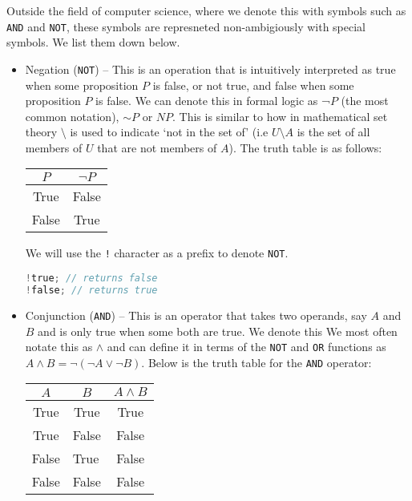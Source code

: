 Outside the field of computer science, where we denote this with symbols such as \verb+AND+ and \verb+NOT+, these symbols are represneted non-ambigiously with special symbols. We list them down below. 

\begin{itemize}

\item Negation (\verb+NOT+) – This is an operation that is intuitively interpreted as true when some proposition \(P\) is false, or not true, and false when some proposition \(P\) is false. We can denote this in formal logic as ¬\(P\) (the most common notation), \(\sim P\) or \(NP\). This is similar to how in mathematical set theory \(\setminus \) is used to indicate `not in the set of' (i.e \({\displaystyle U\setminus A}\) is the set of all members of \(U\) that are not members of \(A\)). The truth table is as follows:


\begin{table}[h]
{\centering
\begin{tabular}{|c|c|}
\hline
\rowcolor[HTML]{EFEFEF} 
\(P\) & \(\neg P\) \\ \hline
True       & False           \\ \hline
False      & True            \\ \hline
\end{tabular} \par }
\end{table}

We will use the \verb+!+ character as a prefix to denote \verb+NOT+. 

\begin{lstlisting}[language=C]
!true; // returns false
!false; // returns true
\end{lstlisting}

\item Conjunction (\verb+AND+) – This is an operator that takes two operands, say \(A\) and \(B\) and is only true when some both are true. We denote this We most often notate this as \(\wedge\) and can define it in terms of the \verb+NOT+ and \verb+OR+ functions as  \(A \wedge B = \neg(\neg A \lor \neg B) \). Below is the truth table for the \verb+AND+ operator:

\begin{table}[h]
{\centering
\begin{tabular}{|c|c|c|}
\hline
\rowcolor[HTML]{EFEFEF} 
\(A\)                           & \(B\)                 & \(A \wedge B\) \\ \hline
True                        & True                       & True       \\ \hline
True                        & False                      & False      \\ \hline
\multicolumn{1}{|l|}{False} & \multicolumn{1}{l|}{True}  & False      \\ \hline
\multicolumn{1}{|l|}{False} & \multicolumn{1}{l|}{False} & False      \\ \hline
\end{tabular} \par }
\end{table}


\end{itemize}
